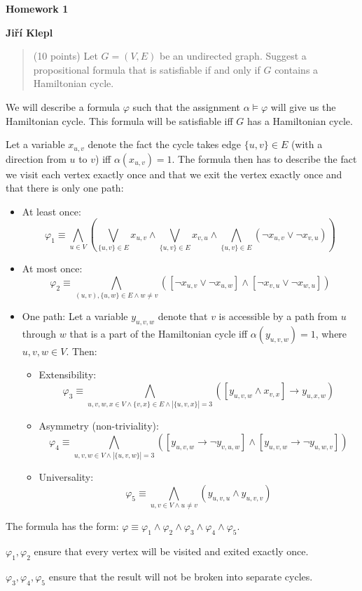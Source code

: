 \documentclass[a4paper,12pt]{article} %
\begin{document}
\begin{center}
    {\Large \bf Homework 1}
    \vspace{2mm}

    {\bf Jiří Klepl}

\end{center}

\vspace{0.4cm}

\begin{quote}
    (10 points) Let $G = (V, E)$ be an undirected graph. Suggest a propositional formula that is satisfiable if and only if $G$ contains a Hamiltonian cycle.
\end{quote}

We will describe a formula $\varphi$ such that the assignment $\alpha \models \varphi$ will give us the Hamiltonian cycle. This formula will be satisfiable iff $G$ has a Hamiltonian cycle.

Let a variable $x_{u, v}$ denote the fact the cycle takes edge $\{u,v\} \in E$ (with a direction from $u$ to $v$) iff $\alpha(x_{u,v}) = 1$. The formula then has to describe the fact we visit each vertex exactly once and that we exit the vertex exactly once and that there is only one path:

\begin{itemize}
    \item 
    At least once:
    $$\varphi_1 \equiv \bigwedge\limits_{u \in V} \left(\bigvee\limits_{\{u,v\} \in E} x_{u,v} \wedge \bigvee\limits_{\{u,v\} \in E} x_{v,u} \wedge \bigwedge\limits_{\{u,v\} \in E} (\neg x_{u,v} \vee \neg x_{v,u}) \right)$$
    \item 
    At most once:
    $$\varphi_2 \equiv \bigwedge\limits_{(u,v), \{u,w\} \in E \wedge w \not= v} ([\neg x_{u,v} \vee \neg x_{u,w}] \wedge [\neg x_{v, u} \vee \neg x_{w, u}])$$
    \item
    One path: Let a variable $y_{u, v, w}$ denote that $v$ is accessible by a path from $u$ through $w$ that is a part of the Hamiltonian cycle iff $\alpha(y_{u,v,w}) = 1$, where $u,v,w \in V$. Then:
    \begin{itemize}
        \item Extensibility:
        $$\varphi_3 \equiv \bigwedge\limits_{u, v, w, x \in V \wedge \{v,x\} \in E \wedge |\{u,v,x\}| = 3} ([y_{u,v,w} \wedge x_{v, x}] \to y_{u,x,w})$$
        \item Asymmetry (non-triviality):
        $$\varphi_4 \equiv \bigwedge\limits_{u, v, w \in V \wedge |\{u,v,w\}| = 3} ([y_{u,v,w} \to \neg y_{v,u,w}] \wedge [y_{u,v,w} \to \neg y_{u,w,v}])$$
        \item Universality:
        $$\varphi_5 \equiv \bigwedge\limits_{u, v \in V \wedge u \not= v} (y_{u,v,u} \wedge y_{u,v,v})$$
    \end{itemize}
\end{itemize}

The formula has the form: $\varphi \equiv \varphi_1 \wedge \varphi_2 \wedge \varphi_3 \wedge \varphi_4 \wedge \varphi_5$.

$\varphi_1, \varphi_2$ ensure that every vertex will be visited and exited exactly once.

$\varphi_3, \varphi_4, \varphi_5$ ensure that the result will not be broken into separate cycles.
\end{document}
